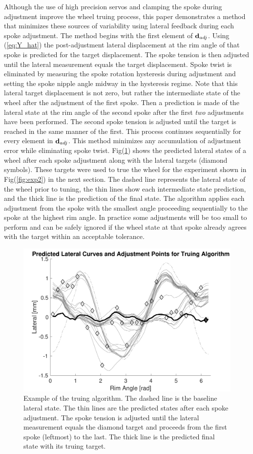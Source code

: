 \documentclass[journal]{IEEEtran}
\begin{document}
Although the use of high precision servos and clamping the spoke during adjustment improve the wheel truing process, this paper demonstrates a method that minimizes these sources of variability using lateral feedback during each spoke adjustment. The method begins with the first element of ${\bf d}_{adj}$. Using (\ref{eq:Y_hat}) the post-adjustment lateral displacement at the rim angle of that spoke is predicted for the target displacement.  The spoke tension is then adjusted until the lateral measurement equals the target displacement. Spoke twist is eliminated by measuring the spoke rotation hysteresis during adjustment and setting the spoke nipple angle midway in the hysteresis regime. Note that this lateral target displacement is not zero, but rather the intermediate state of the wheel after the adjustment of the first spoke.  Then a prediction is made of the lateral state at the rim angle of the second spoke after the first \emph{two} adjustments have been performed.  The second spoke tension is adjusted until the target is reached in the same manner of the first. This process continues sequentially for every element in ${\bf d}_{adj}$. This method minimizes any accumulation of adjustment error while eliminating spoke twist.  Fig(\ref{fig:algo}) shows the predicted lateral states of a wheel after each spoke adjustment along with the lateral targets (diamond symbols). These targets were used to true the wheel for the experiment shown in Fig(\ref{fig:exp2}) in the next section. The dashed line represents the lateral state of the wheel prior to tuning, the thin lines show each intermediate state prediction, and the thick line is the prediction of the final state. The algorithm applies each adjustment from the spoke with the smallest angle proceeding sequentially to the spoke at the highest rim angle. In practice some adjustments will be too small to perform and can be safely ignored if the wheel state at that spoke already agrees with the target within an acceptable tolerance.

\begin{figure}[!t]
\centering
\includegraphics[width=3.5 in]{./figs/algo}
\caption{Example of the truing algorithm. The dashed line is the baseline lateral state.  The thin lines are the predicted states after each spoke adjustment. The spoke tension is adjusted until the lateral measurement equals the diamond target and proceeds from the first spoke (leftmost) to the last.  The thick line is the predicted final state with its truing target. }
\label{fig:algo}
\end{figure}
\end{document}
